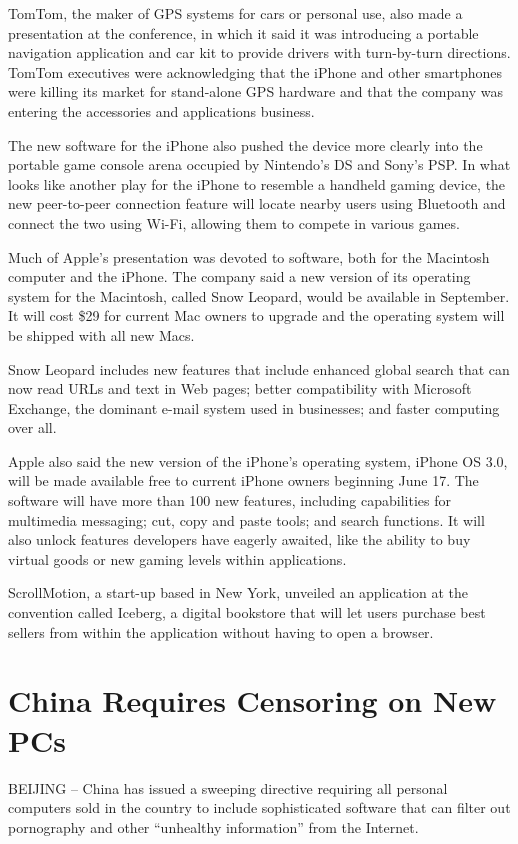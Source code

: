 \documentclass[12pt,a4paper,onecolumn]{article}
\begin{document}
TomTom, the maker of GPS systems for cars or personal use, also made a presentation at the
conference, in which it said it was introducing a portable navigation application and car kit to
provide drivers with turn-by-turn directions. TomTom executives were acknowledging that the iPhone
and other smartphones were killing its market for stand-alone GPS hardware and that the company was
entering the accessories and applications business.

The new software for the iPhone also pushed the device more clearly into the portable game console
arena occupied by Nintendo's DS and Sony's PSP. In what looks like another play for the iPhone to
resemble a handheld gaming device, the new peer-to-peer connection feature will locate nearby users
using Bluetooth and connect the two using Wi-Fi, allowing them to compete in various games.

Much of Apple's presentation was devoted to software, both for the Macintosh computer and the
iPhone. The company said a new version of its operating system for the Macintosh, called Snow
Leopard, would be available in September. It will cost \$29 for current Mac owners to upgrade and
the operating system will be shipped with all new Macs.

Snow Leopard includes new features that include enhanced global search that can now read URLs and
text in Web pages; better compatibility with Microsoft Exchange, the dominant e-mail system used in
businesses; and faster computing over all.

Apple also said the new version of the iPhone's operating system, iPhone OS 3.0, will be made
available free to current iPhone owners beginning June 17. The software will have more than 100 new
features, including capabilities for multimedia messaging; cut, copy and paste tools; and search
functions. It will also unlock features developers have eagerly awaited, like the ability to buy
virtual goods or new gaming levels within applications.

ScrollMotion, a start-up based in New York, unveiled an application at the convention called
Iceberg, a digital bookstore that will let users purchase best sellers from within the application
without having to open a browser.

\section{China Requires Censoring on New PCs}

BEIJING -- China has issued a sweeping directive requiring all personal computers sold in the
country to include sophisticated software that can filter out pornography and other ``unhealthy
information'' from the Internet.
\end{document}
